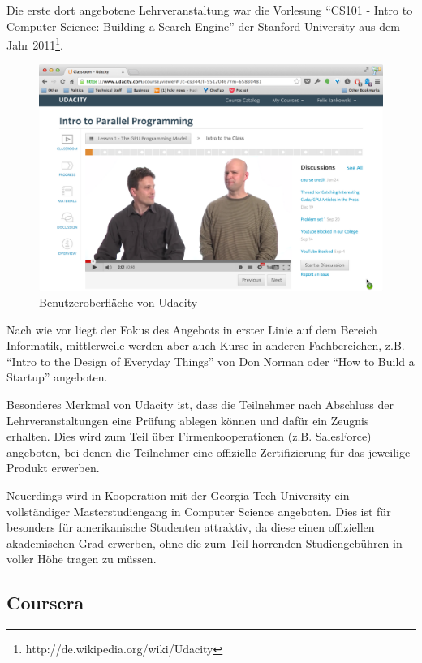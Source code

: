 			Die erste dort angebotene Lehrveranstaltung war die Vorlesung "`CS101 - Intro to Computer Science: Building a Search Engine"' der Stanford University aus dem Jahr 2011\footnote{http://de.wikipedia.org/wiki/Udacity}.


			\begin{figure}[h]
				\begin{center}
					\includegraphics[width=\textwidth]{img/udacity}
					\caption{Benutzeroberfläche von Udacity}
					\label{fig:screenshot-udacity}
				\end{center}
			\end{figure}


			Nach wie vor liegt der Fokus des Angebots in erster Linie auf dem Bereich Informatik, mittlerweile werden aber auch Kurse in anderen Fachbereichen, z.B. "`Intro to the Design of Everyday Things"' von Don Norman oder "`How to Build a Startup"' angeboten.

			Besonderes Merkmal von Udacity ist, dass die Teilnehmer nach Abschluss der Lehrveranstaltungen eine Prüfung ablegen können und dafür ein Zeugnis erhalten.
			Dies wird zum Teil über Firmenkooperationen (z.B. SalesForce) angeboten, bei denen die Teilnehmer eine offizielle Zertifizierung für das jeweilige Produkt erwerben.

			Neuerdings wird in Kooperation mit der Georgia Tech University ein vollständiger Masterstudiengang in Computer Science angeboten.
			Dies ist für besonders für amerikanische Studenten attraktiv, da diese einen offiziellen akademischen Grad erwerben, ohne die zum Teil horrenden Studiengebühren in voller Höhe tragen zu müssen.

		\subsection{Coursera}

